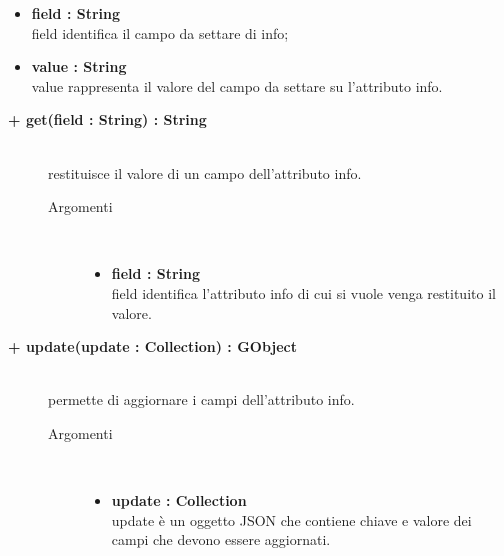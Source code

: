 \begin{description}
\begin{description}
\begin{description}
\begin{itemize}
					\item \textbf{field : String			} \hfill \\
					field identifica il campo da settare di info;
					\item \textbf{value : String			} \hfill \\
					value rappresenta il valore del campo da settare su l'attributo info.
				\end{itemize}
		\end{description}

\end{description}

\begin{description}
		\item[\textbf{+ get(field : String) : String			}] \hfill \\
			restituisce il valore di un campo dell'attributo info.
			
		\begin{description}
			\item[Argomenti] \hfill \\
				\begin{itemize}
				
					\item \textbf{field : String			} \hfill \\
					field identifica l'attributo info di cui si vuole venga restituito il valore.
				\end{itemize}
		\end{description}

\end{description}

\begin{description}
		\item[\textbf{+ update(update : Collection) : GObject			}] \hfill \\
			permette di aggiornare i campi dell'attributo info.
			
		\begin{description}
			\item[Argomenti] \hfill \\
				\begin{itemize}
				
					\item \textbf{update : Collection			} \hfill \\
					update è un oggetto JSON che contiene chiave e valore dei campi che devono essere aggiornati. 
				\end{itemize}
		\end{description}


\end{description}
\end{description}
